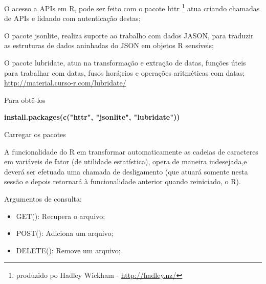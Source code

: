 \documentclass[12pt,a4paper,oneside]{erdc}
\begin{document}
O acesso a APIs em R, pode ser feito com o pacote httr \footnote{produzido po Hadley Wickham - \url{http://hadley.nz/}} atua criando chamadas de APIs e lidando com autenticação destas;

O pacote jsonlite, realiza suporte ao trabalho com dados JASON, para traduzir as estruturas de dados aninhadas do JSON em objetos R sensíveis; 

O  pacote lubridate, atua na transformação e extração de datas, funções úteis para trabalhar com datas, fusos horá¡rios e operações aritméticas com datas; 
\url{http://material.curso-r.com/lubridate/}


Para obtê-los 

\textbf{install.packages(c("httr", "jsonlite", "lubridate"))}


Carregar os pacotes


A funcionalidade do R em transformar automaticamente as cadeias de caracteres em variáveis de fator (de utilidade estatística), opera de maneira indesejada,e deverá ser efetuada uma chamada de desligamento (que atuará somente nesta sessão e depois retornará à funcionalidade anterior quando reiniciado, o R). 



Argumentos de consulta:
\begin{itemize}
	\item GET(): Recupera o arquivo;
	\item POST(): Adiciona um arquivo;
	\item DELETE(): Remove um arquivo;
	
\end{itemize}
\end{document}
